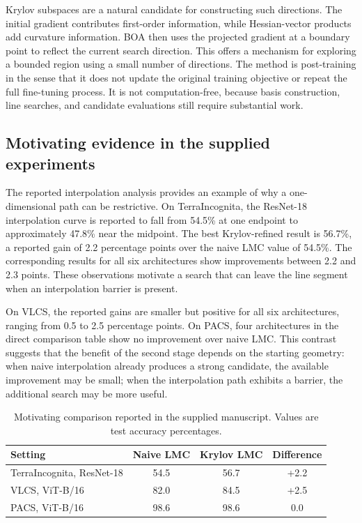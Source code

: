 \documentclass[11pt,a4paper]{article}
\begin{document}
Krylov subspaces are a natural candidate for constructing such directions. The initial gradient contributes first-order information, while Hessian-vector products add curvature information. BOA then uses the projected gradient at a boundary point to reflect the current search direction. This offers a mechanism for exploring a bounded region using a small number of directions. The method is post-training in the sense that it does not update the original training objective or repeat the full fine-tuning process. It is not computation-free, because basis construction, line searches, and candidate evaluations still require substantial work.

\subsection{Motivating evidence in the supplied experiments}
The reported interpolation analysis provides an example of why a one-dimensional path can be restrictive. On TerraIncognita, the ResNet-18 interpolation curve is reported to fall from 54.5\% at one endpoint to approximately 47.8\% near the midpoint. The best Krylov-refined result is 56.7\%, a reported gain of 2.2 percentage points over the naive LMC value of 54.5\%. The corresponding results for all six architectures show improvements between 2.2 and 2.3 points. These observations motivate a search that can leave the line segment when an interpolation barrier is present.

On VLCS, the reported gains are smaller but positive for all six architectures, ranging from 0.5 to 2.5 percentage points. On PACS, four architectures in the direct comparison table show no improvement over naive LMC. This contrast suggests that the benefit of the second stage depends on the starting geometry: when naive interpolation already produces a strong candidate, the available improvement may be small; when the interpolation path exhibits a barrier, the additional search may be more useful.

\begin{table}[H]
\centering
\caption{Motivating comparison reported in the supplied manuscript. Values are test accuracy percentages.}
\label{tab:motivation}
\begin{tabular}{lccc}
\toprule
Setting & Naive LMC & Krylov LMC & Difference \\
\midrule
TerraIncognita, ResNet-18 & 54.5 & 56.7 & +2.2 \\
VLCS, ViT-B/16 & 82.0 & 84.5 & +2.5 \\
PACS, ViT-B/16 & 98.6 & 98.6 & 0.0 \\
\bottomrule
\end{tabular}
\end{table}
\end{document}
